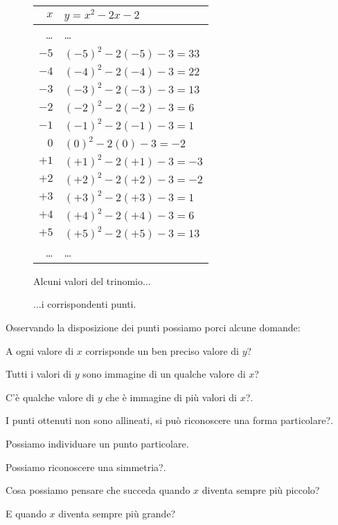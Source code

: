 \begin{figure}[h]
 \centering
 \begin{minipage}[]{.48\textwidth}
  \begin{center}
   \begin{tabular}{r|l}
    $x$   & $y=x^2-2x-2$ \\
    \hline
    \dots & \dots \\
    $-5$ & $(-5)^2 -2(-5) -3 = 33$ \\
    $-4$ & $(-4)^2 -2(-4) -3 = 22$ \\
    $-3$ & $(-3)^2 -2(-3) -3 = 13$ \\
    $-2$ & $(-2)^2 -2(-2) -3 = 6$ \\
    $-1$ & $(-1)^2 -2(-1) -3 = 1$ \\
     $0$ & $(0)^2 -2(0) -3 = -2$ \\
    $+1$ & $(+1)^2 -2(+1) -3 = -3$ \\
    $+2$ & $(+2)^2 -2(+2) -3 = -2$ \\
    $+3$ & $(+3)^2 -2(+3) -3 = 1$ \\
    $+4$ & $(+4)^2 -2(+4) -3 = 6$ \\
    $+5$ & $(+5)^2 -2(+5) -3 = 13$ \\
    \dots & \dots \\
   \end{tabular}
  \caption{Alcuni valori del trinomio...} \label{tab:trinomio0}
  \end{center}
 \end{minipage}
\begin{minipage}[]{.48\textwidth}
\begin{center}
\begin{inaccessibleblock}
  
  \caption{...i corrispondenti punti.} \label{fig:trinomio0}
\end{inaccessibleblock}
\end{center}
\end{minipage}
\end{figure}

Osservando la disposizione dei punti possiamo porci alcune domande:
\begin{enumerate*}
 \item A ogni valore di $x$ corrisponde un ben preciso valore di $y$?
 \item Tutti i valori di $y$ sono immagine di un qualche valore di $x$?
 \item C'è qualche valore di $y$ che è immagine di più valori di $x$?.
 \item I punti ottenuti non sono allineati, si può riconoscere una forma 
  particolare?.
 \item Possiamo individuare un punto particolare.
 \item Possiamo riconoscere una simmetria?.
 \item Cosa possiamo pensare che succeda quando $x$ diventa sempre più piccolo?
 \item E quando $x$ diventa sempre più grande?
\end{enumerate*}

